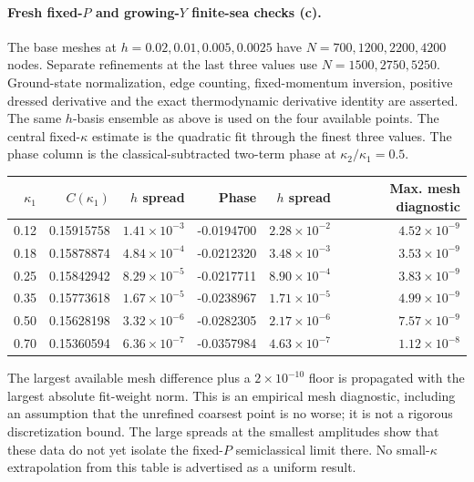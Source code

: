 \documentclass[11pt,a4paper]{article}
\begin{document}
\paragraph{Fresh fixed-$P$ and growing-$Y$ finite-sea checks (c).}
The base meshes at $h=0.02,0.01,0.005,0.0025$ have
$N=700,1200,2200,4200$ nodes. Separate refinements at the last three values
use $N=1500,2750,5250$. Ground-state normalization, edge counting,
fixed-momentum inversion, positive dressed derivative and the exact
thermodynamic derivative identity are asserted. The same $h$-basis ensemble
as above is used on the four available points. The central fixed-$\kappa$
estimate is the quadratic fit through the finest three values.
The phase column is the classical-subtracted two-term phase at
$\kappa_2/\kappa_1=0.5$.
\begin{center}\small\begin{tabular}{rrrrrr}\toprule
$\kappa_1$ & $C(\kappa_1)$ & $h$ spread & Phase & $h$ spread & Max. mesh diagnostic\\\midrule
0.12 & 0.15915758 & $1.41\times10^{-3}$ & -0.0194700 & $2.28\times10^{-2}$ & $4.52\times10^{-9}$\\
0.18 & 0.15878874 & $4.84\times10^{-4}$ & -0.0212320 & $3.48\times10^{-3}$ & $3.53\times10^{-9}$\\
0.25 & 0.15842942 & $8.29\times10^{-5}$ & -0.0217711 & $8.90\times10^{-4}$ & $3.83\times10^{-9}$\\
0.35 & 0.15773618 & $1.67\times10^{-5}$ & -0.0238967 & $1.71\times10^{-5}$ & $4.99\times10^{-9}$\\
0.50 & 0.15628198 & $3.32\times10^{-6}$ & -0.0282305 & $2.17\times10^{-6}$ & $7.57\times10^{-9}$\\
0.70 & 0.15360594 & $6.36\times10^{-7}$ & -0.0357984 & $4.63\times10^{-7}$ & $1.12\times10^{-8}$\\
\bottomrule\end{tabular}\end{center}
The largest available mesh difference plus a $2\times10^{-10}$ floor is
propagated with the largest absolute fit-weight norm. This is an empirical
mesh diagnostic, including an assumption that the unrefined coarsest point
is no worse; it is not a rigorous discretization bound. The large spreads
at the smallest amplitudes show that these data do not yet isolate the
fixed-$P$ semiclassical limit there. No small-$\kappa$ extrapolation from
this table is advertised as a uniform result.
\end{document}
